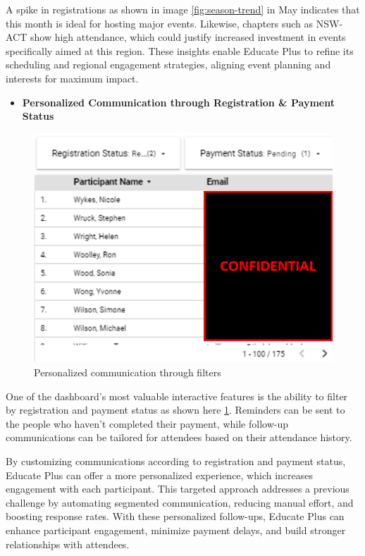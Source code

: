 \documentclass[11pt,a4paper,]{article}
\providecommand{\tightlist}{%
  \setlength{\itemsep}{0pt}\setlength{\parskip}{0pt}}
\begin{document}
A spike in registrations as shown in image \ref{fig:season-trend} in May indicates that this month is ideal for hosting major events. Likewise, chapters such as NSW-ACT show high attendance, which could justify increased investment in events specifically aimed at this region. These insights enable Educate Plus to refine its scheduling and regional engagement strategies, aligning event planning and interests for maximum impact.

\begin{itemize}
\tightlist
\item
  \textbf{Personalized Communication through Registration \& Payment Status}
\end{itemize}

\begin{figure}[H]

{\centering \includegraphics[width=0.8\linewidth]{Images/personalized_communication} 

}

\caption{Personalized communication through filters}\label{fig:personalized}
\end{figure}

One of the dashboard's most valuable interactive features is the ability to filter by registration and payment status as shown here \ref{fig:personalized}. Reminders can be sent to the people who haven't completed their payment, while follow-up communications can be tailored for attendees based on their attendance history.

By customizing communications according to registration and payment status, Educate Plus can offer a more personalized experience, which increases engagement with each participant. This targeted approach addresses a previous challenge by automating segmented communication, reducing manual effort, and boosting response rates. With these personalized follow-ups, Educate Plus can enhance participant engagement, minimize payment delays, and build stronger relationships with attendees.
\end{document}
